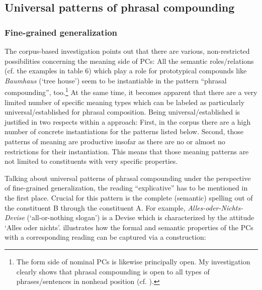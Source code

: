 \documentclass[output=paper]{LSP/langsci}
\begin{document}
\subsection{Universal patterns of phrasal compounding} \label{sec:hein:3.1}
\subsubsection{Fine-grained generalization}\label{sec:hein:3.1.1}

The corpus-based investigation points out that there are various, non-restricted possibilities concerning the meaning side of PCs: All the semantic roles\slash relations (cf. the examples in table 6) which  play  a role for prototypical  compounds like \textit{Baumhaus} (`tree house') seem to be instantiable in the pattern ``phrasal compounding'', too.\footnote{The form side of nominal PCs is likewise principally open. My investigation clearly shows that phrasal compounding is open to all types of phrases\slash sentences in nonhead position (cf. \citealt[Chapter III.3.1.2]{Hein2015}).}  At the same time, it becomes apparent that there are a very limited number of specific meaning types which can be labeled as particularly universal\slash established for phrasal composition. Being universal\slash es\-ta\-blished is justified in two respects within a  approach: First, in the corpus there are a high number of concrete instantiations for the patterns listed below. Second, those patterns of meaning are productive insofar as there are no or almost no restrictions for their instantiation. This means that those meaning patterns are not limited to constituents with very specific properties.  

Talking about universal patterns of phrasal compounding under the perspective of fine-grained generalization, the reading ``explicative'' has to be mentioned in the first place. Crucial for this pattern is the complete (semantic) spelling out of the constituent B through the constituent A. For example, \textit{Alles-oder-Nichts-Devise} (`all-or-nothing slogan’) is a Devise which is characterized by the attitude ‘Alles oder nichts’.  illustrates how the formal and semantic properties of the PCs with a corresponding reading can be captured via a construction:
 
\end{document}
